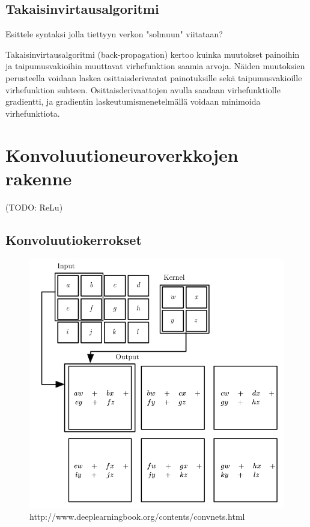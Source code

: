 \documentclass[finnish]{tktltiki2}
\theoremstyle{definition}
\theoremstyle{remark}
\begin{document}
  \subsection{Takaisinvirtausalgoritmi}

  Esittele syntaksi jolla tiettyyn verkon "solmuun" viitataan?

  Takaisinvirtausalgoritmi (back-propagation) kertoo kuinka muutokset painoihin ja taipumusvakioihin muuttavat virhefunktion saamia arvoja. Näiden muutoksien perusteella voidaan laskea osittaisderivaatat painotuksille sekä taipumusvakioille virhefunktion suhteen. Osittaisderivaattojen avulla saadaan virhefunktiolle gradientti, ja gradientin laskeutumismenetelmällä voidaan minimoida virhefunktiota.
  

  \section{Konvoluutioneuroverkkojen rakenne}
  (TODO: ReLu)
  \subsection{Konvoluutiokerrokset}

  \begin{figure}[h]
  \label{pic:convolution}
  \centering
  \includegraphics[scale=0.4]{convolution}
  \caption{http://www.deeplearningbook.org/contents/convnets.html}
  \end{figure}
\end{document}
